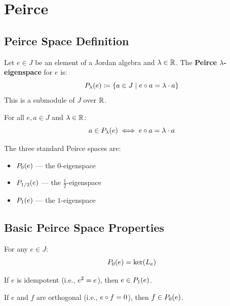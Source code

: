 \section{Peirce}

\subsection{Peirce Space Definition}

\begin{definition}[PeirceSpace]
Let $e \in J$ be an element of a Jordan algebra and $\lambda \in \R$. The \textbf{Peirce $\lambda$-eigenspace} for $e$ is:
\[ \Peirce{e}{\lambda} \defas \{ a \in J \mid e \jmul a = \lambda \cdot a \} \]
This is a submodule of $J$ over $\R$.
\end{definition}

\begin{lemma}
For all $e, a \in J$ and $\lambda \in \R$:
\[ a \in \Peirce{e}{\lambda} \iff e \jmul a = \lambda \cdot a \]
\end{lemma}

\begin{definition}
The three standard Peirce spaces are:
\begin{itemize}
  \item $\Peirce{e}{0}$ --- the $0$-eigenspace
  \item $\Peirce{e}{1/2}$ --- the $\frac{1}{2}$-eigenspace
  \item $\Peirce{e}{1}$ --- the $1$-eigenspace
\end{itemize}
\end{definition}

\subsection{Basic Peirce Space Properties}

\begin{theorem}
For any $e \in J$:
\[ \Peirce{e}{0} = \ker(\Lop{e}) \]
\end{theorem}

\begin{theorem}
If $e$ is idempotent (i.e., $\jsq{e} = e$), then $e \in \Peirce{e}{1}$.
\end{theorem}

\begin{theorem}
If $e$ and $f$ are orthogonal (i.e., $e \jmul f = 0$), then $f \in \Peirce{e}{0}$.
\end{theorem}

